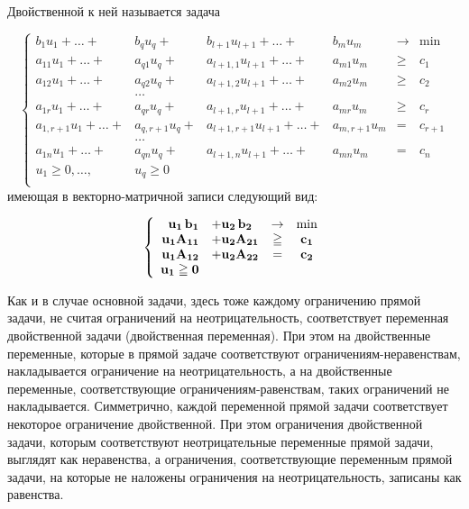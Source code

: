     Двойственной к ней называется задача

\begin{equation*}\label{DualOZLP}
\left\{
\begin{array}{rrrrll}
     b_1 u_1  +  \ldots + & b_q u_q+     & b_{l+1}u_{l+1}    +\ldots +  &b_m u_m    &\to  &\min \\
           a_{11} u_1 +  \ldots + & a_{q1} u_q+  & a_{l+1,1} u_{l+1} +\ldots +  &a_{m1} u_m &\geqslant & c_1 \\
           a_{12} u_1 +  \ldots + & a_{q2} u_q+  & a_{l+1,2} u_{l+1} +\ldots +  &a_{m2} u_m &\geqslant & c_2 \\
                                  & \ldots &&&&\\
           a_{1r} u_1+   \ldots + & a_{qr} u_q+  & a_{l+1,r} u_{l+1} +\ldots +  &a_{mr} u_m &\geqslant & c_r \\
        a_{1,r+1} u_1+   \ldots + & a_{q,r+1} u_q+  & a_{l+1,r+1} u_{l+1} +\ldots +  &a_{m,r+1} u_m &= & c_{r+1} \\
                                  & \ldots &&&&\\
           a_{1n} u_1+   \ldots + & a_{qn} u_q+  & a_{l+1,n} u_{l+1} +\ldots +  &a_{mn} u_m &= & c_n \\
           u_1 \ge 0, \ldots,  \;\;  &u_q \ge 0&&&&\\
\end{array} \right.
\end{equation*}
    имеющая в векторно-матричной записи следующий вид:

\begin{equation}\label{OZLPV-2-dv}
\left\{
\begin{array}{rlcc}
    \mathbf{u_1} \, \mathbf{b_1} &+ \mathbf{u_2} \, \mathbf{b_2} &\to & \min \\
   \mathbf{u_1}\mathbf{A_{11}} & + \mathbf{u_2}\mathbf{A_{21}} & \geqq &\mathbf{c_1}\\
  \mathbf{u_1}\mathbf{A_{12}} & + \mathbf{u_2}\mathbf{A_{22}} & = &\mathbf{c_2}\\
  \mathbf{u_1} \geqq \mathbf{0}&\\
\end{array} \right.
\end{equation}





    Как и в случае основной задачи, здесь тоже каждому ограничению прямой задачи,
    не считая ограничений на неотрицательность, соответствует
    переменная двойственной задачи (двойственная переменная).
    При этом на
    двойственные переменные, которые в прямой задаче соответствуют
    ограничениям-неравенствам, накладывается ограничение на
    неотрицательность, а на двойственные переменные, соответствующие
    ограничениям-равенствам, таких ограничений не накладывается.
    Симметрично, каждой переменной прямой задачи соответствует
    некоторое ограничение двойственной. При этом
    ограничения двойственной задачи, которым
    соответствуют неотрицательные переменные прямой задачи,
    выглядят как неравенства, а ограничения, соответствующие
    переменным прямой задачи, на которые не наложены ограничения на
    неотрицательность, записаны как равенства.

